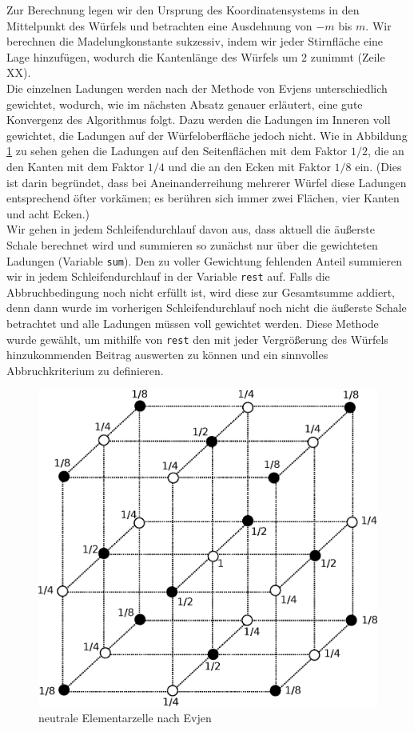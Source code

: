 \documentclass[10pt,a4paper]{article}
\begin{document}
Zur Berechnung legen wir den Ursprung des Koordinatensystems in den Mittelpunkt des
Würfels und betrachten eine Ausdehnung von $-m$ bis $m$.
Wir berechnen die Madelungkonstante sukzessiv, indem wir jeder Stirnfläche eine Lage
hinzufügen, wodurch die Kantenlänge des Würfels um $2$ zunimmt (Zeile XX).\\
Die einzelnen Ladungen werden nach der Methode von
Evjens \cite{Evjen} unterschiedlich gewichtet, wodurch, wie im nächsten Absatz genauer
erläutert, eine gute Konvergenz des Algorithmus folgt. Dazu werden die Ladungen im
Inneren voll gewichtet, die Ladungen auf der Würfeloberfläche jedoch nicht. Wie in
Abbildung \ref{skalierungsgrafik3d} zu sehen gehen die Ladungen auf den Seitenflächen mit
dem Faktor $1/2$, die an den Kanten mit dem Faktor $1/4$ und die an den Ecken mit Faktor
$1/8$ ein. (Dies ist darin begründet, dass bei Aneinanderreihung mehrerer Würfel diese
Ladungen entsprechend öfter vorkämen; es berühren sich immer zwei Flächen, vier Kanten
und acht Ecken.)\\
Wir gehen in jedem Schleifendurchlauf davon aus, dass aktuell die äußerste Schale berechnet
wird und summieren so zunächst nur über die gewichteten Ladungen (Variable \texttt{sum}).
Den zu voller Gewichtung fehlenden Anteil summieren wir in jedem Schleifendurchlauf in der Variable
\texttt{rest} auf. Falls die Abbruchbedingung noch nicht erfüllt ist, wird diese zur
Gesamtsumme addiert, denn dann wurde im vorherigen Schleifendurchlauf noch nicht die
äußerste Schale betrachtet und alle Ladungen müssen voll gewichtet werden. Diese Methode
wurde gewählt, um mithilfe von \texttt{rest} den mit jeder Vergrößerung des Würfels
hinzukommenden Beitrag auswerten zu können und ein sinnvolles Abbruchkriterium zu definieren.\\

\begin{figure}[h]
	\centering
	\includegraphics[scale = 0.4]{./figures/wuerfel.eps}
	\caption{neutrale Elementarzelle nach Evjen}
	\label{skalierungsgrafik3d}
\end{figure}
	
\end{document}
